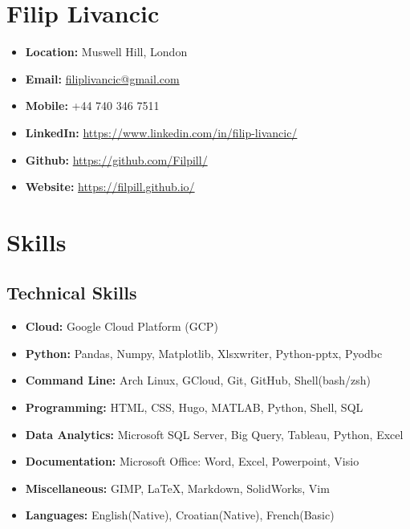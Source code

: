 \documentclass[a4paper,9pt]{article}
\date{}
\begin{document}
\section*{Filip Livancic}

\begin{itemize}[noitemsep]
    \item\textbf{Location: }Muswell Hill, London
    \item\textbf{Email: }\href{mailto:filiplivancic@gmail.com}{filiplivancic@gmail.com}
    \item\textbf{Mobile: }+44 740 346 7511
    \item\textbf{LinkedIn: }\url{https://www.linkedin.com/in/filip-livancic/}
    \item\textbf{Github: }\url{https://github.com/Filpill/}
    \item\textbf{Website: }\url{https://filpill.github.io/}
\end{itemize}


\section*{Skills}
\subsection*{Technical Skills}
\begin{itemize}[noitemsep]
    \item \textbf{Cloud:} \hspace{17mm} Google Cloud Platform (GCP)
	\item \textbf{Python:} \hspace{14.8mm} Pandas, Numpy, Matplotlib, Xlsxwriter, Python-pptx, Pyodbc
	\item \textbf{Command Line:} \hspace{0.5mm} Arch Linux, GCloud, Git, GitHub, Shell(bash/zsh)
	\item \textbf{Programming:} \hspace{3.3mm} HTML, CSS, Hugo, MATLAB, Python, Shell, SQL
	\item \textbf{Data Analytics:} \hspace{1mm} Microsoft SQL Server, Big Query, Tableau, Python, Excel
    \item \textbf{Documentation:} \hspace{0.5mm} Microsoft Office: Word, Excel, Powerpoint, Visio
	\item \textbf{Miscellaneous:} \hspace{3.3mm} GIMP, LaTeX, Markdown, SolidWorks, Vim
	\item \textbf{Languages:} \hspace{9.3mm} English(Native), Croatian(Native), French(Basic)
\end{itemize}
\end{document}
